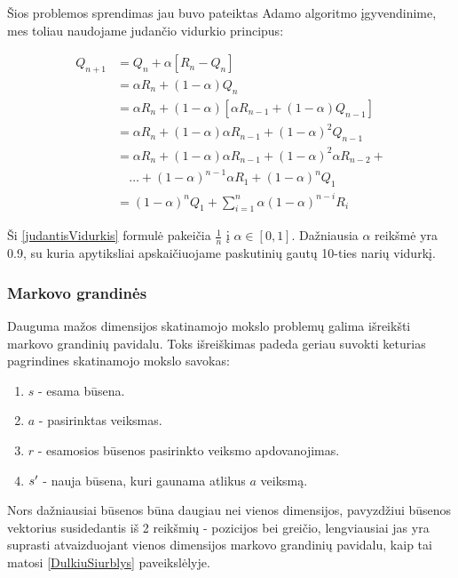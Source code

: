 \documentclass[a4paper, 12pt]{article}
\begin{document}
Šios problemos sprendimas jau buvo pateiktas Adamo algoritmo įgyvendinime, mes toliau naudojame judančio vidurkio principus:

\begin{equation}
\label{judantisVidurkis}
\begin{aligned}
Q_{n+1} &=Q_{n}+\alpha\left[R_{n}-Q_{n}\right] \\
&=\alpha R_{n}+(1-\alpha) Q_{n} \\
&=\alpha R_{n}+(1-\alpha)\left[\alpha R_{n-1}+(1-\alpha) Q_{n-1}\right] \\
&=\alpha R_{n}+(1-\alpha) \alpha R_{n-1}+(1-\alpha)^{2} Q_{n-1} \\
&=\alpha R_{n}+(1-\alpha) \alpha R_{n-1}+(1-\alpha)^{2} \alpha R_{n-2}+\\
& \quad \ldots+(1-\alpha)^{n-1} \alpha R_{1}+(1-\alpha)^{n} Q_{1} \\
&=(1-\alpha)^{n} Q_{1}+\sum_{i=1}^{n} \alpha(1-\alpha)^{n-i} R_{i}
\end{aligned}
\end{equation}

Ši \ref{judantisVidurkis} formulė pakeičia $\frac{1}{n}$ į $\alpha \in [0,1]$. Dažniausia $\alpha$ reikšmė yra 0.9, su kuria apytiksliai apskaičiuojame paskutinių gautų 10-ties narių vidurkį.

\subsubsection{Markovo grandinės}

Dauguma mažos dimensijos skatinamojo mokslo problemų galima išreikšti markovo grandinių pavidalu. Toks išreiškimas padeda geriau suvokti keturias pagrindines skatinamojo mokslo savokas:

\begin{enumerate}
  \addtolength{\itemsep}{-0.5\baselineskip} 
  \item $s$ - esama būsena.
  \item $a$ - pasirinktas veiksmas.
  \item $r$ - esamosios būsenos pasirinkto veiksmo apdovanojimas.
  \item $s\sp{\prime}$ - nauja būsena, kuri gaunama atlikus $a$ veiksmą.
\end{enumerate}

Nors dažniausiai būsenos būna daugiau nei vienos dimensijos, pavyzdžiui būsenos vektorius susidedantis iš 2 reikšmių - pozicijos bei greičio, lengviausiai jas yra suprasti atvaizduojant vienos dimensijos markovo grandinių pavidalu, kaip tai matosi \ref{DulkiuSiurblys} paveikslėlyje.
\end{document}
